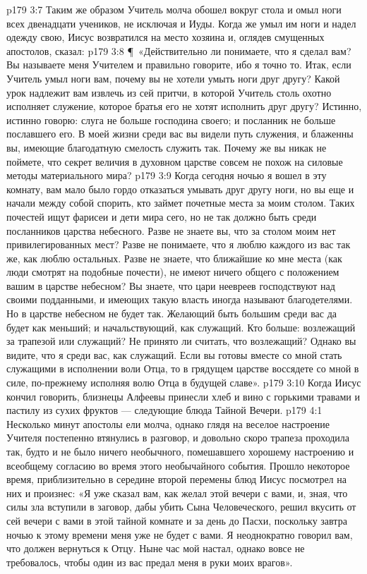 \vs p179 3:7 Таким же образом Учитель молча обошел вокруг стола и омыл ноги всех двенадцати учеников, не исключая и Иуды. Когда же умыл им ноги и надел одежду свою, Иисус возвратился на место хозяина и, оглядев смущенных апостолов, сказал:
\vs p179 3:8 \P\ «Действительно ли понимаете, что я сделал вам? Вы называете меня Учителем и правильно говорите, ибо я точно то. Итак, если Учитель умыл ноги вам, почему вы не хотели умыть ноги друг другу? Какой урок надлежит вам извлечь из сей притчи, в которой Учитель столь охотно исполняет служение, которое братья его не хотят исполнить друг другу? Истинно, истинно говорю: слуга не больше господина своего; и посланник не больше пославшего его. В моей жизни среди вас вы видели путь служения, и блаженны вы, имеющие благодатную смелость служить так. Почему же вы никак не поймете, что секрет величия в духовном царстве совсем не похож на силовые методы материального мира?
\vs p179 3:9 Когда сегодня ночью я вошел в эту комнату, вам мало было гордо отказаться умывать друг другу ноги, но вы еще и начали между собой спорить, кто займет почетные места за моим столом. Таких почестей ищут фарисеи и дети мира сего, но не так должно быть среди посланников царства небесного. Разве не знаете вы, что за столом моим нет привилегированных мест? Разве не понимаете, что я люблю каждого из вас так же, как люблю остальных. Разве не знаете, что ближайшие ко мне места (как люди смотрят на подобные почести), не имеют ничего общего с положением вашим в царстве небесном? Вы знаете, что цари неевреев господствуют над своими подданными, и имеющих такую власть иногда называют благодетелями. Но в царстве небесном не будет так. Желающий быть большим среди вас да будет как меньший; и начальствующий, как служащий. Кто больше: возлежащий за трапезой или служащий? Не принято ли считать, что возлежащий? Однако вы видите, что я среди вас, как служащий. Если вы готовы вместе со мной стать служащими в исполнении воли Отца, то в грядущем царстве воссядете со мной в силе, по\hyp{}прежнему исполняя волю Отца в будущей славе».
\vs p179 3:10 Когда Иисус кончил говорить, близнецы Алфеевы принесли хлеб и вино с горькими травами и пастилу из сухих фруктов --- следующие блюда Тайной Вечери.
\vs p179 4:1 Несколько минут апостолы ели молча, однако глядя на веселое настроение Учителя постепенно втянулись в разговор, и довольно скоро трапеза проходила так, будто и не было ничего необычного, помешавшего хорошему настроению и всеобщему согласию во время этого необычайного события. Прошло некоторое время, приблизительно в середине второй перемены блюд Иисус посмотрел на них и произнес: «Я уже сказал вам, как желал этой вечери с вами, и, зная, что силы зла вступили в заговор, дабы убить Сына Человеческого, решил вкусить от сей вечери с вами в этой тайной комнате и за день до Пасхи, поскольку завтра ночью к этому времени меня уже не будет с вами. Я неоднократно говорил вам, что должен вернуться к Отцу. Ныне час мой настал, однако вовсе не требовалось, чтобы один из вас предал меня в руки моих врагов».
